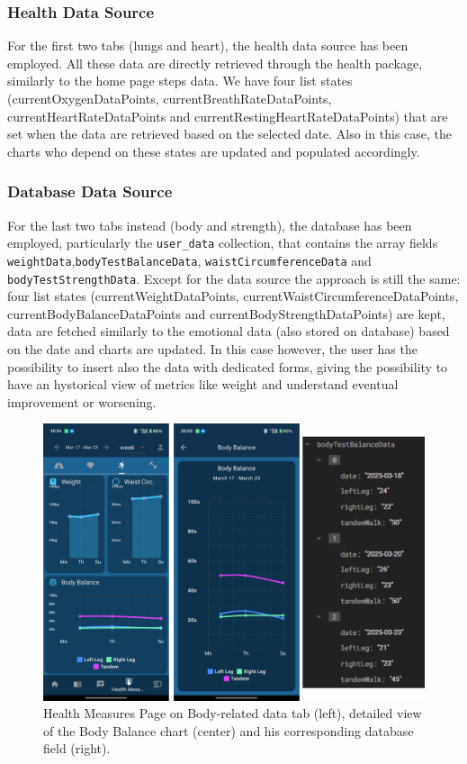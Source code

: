 \subsubsection{Health Data Source}
For the first two tabs (lungs and heart), the health data source has been employed. All these data are directly retrieved through the health package, similarly to the home page steps data. We have four list states (currentOxygenDataPoints, currentBreathRateDataPoints, currentHeartRateDataPoints and currentRestingHeartRateDataPoints) that are set when the data are retrieved based on the selected date. Also in this case, the charts who depend on these states are updated and populated accordingly.

\subsubsection{Database Data Source}
For the last two tabs instead (body and strength), the database has been employed, particularly the \texttt{user\_data} collection, that contains the array fields \texttt{weightData},\newline\texttt{bodyTestBalanceData}, \texttt{waistCircumferenceData} and \texttt{bodyTestStrengthData}. Except for the data source the approach is still the same: four list states (currentWeightDataPoints, currentWaistCircumferenceDataPoints, currentBodyBalanceDataPoints and currentBodyStrengthDataPoints) are kept, data are fetched similarly to the emotional data (also stored on database) based on the date and charts are updated. In this case however, the user has the possibility to insert also the data with dedicated forms, giving the possibility to have an hystorical view of metrics like weight and understand eventual improvement or worsening.

\begin{figure}
    \centering
    \includegraphics[width=1.0\linewidth]{./images/healthMeasures.jpg}
    \caption{Health Measures Page on Body-related data tab (left), detailed view of the Body Balance chart (center) and his corresponding database field (right).}
\end{figure}

